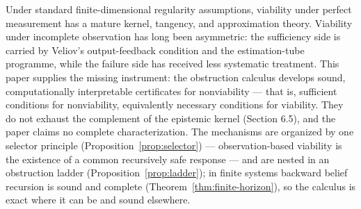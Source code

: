 \documentclass[10pt,twocolumn]{article}
\theoremstyle{definition}
\begin{document}
Under standard finite-dimensional regularity assumptions, viability under perfect measurement has a mature kernel, tangency, and approximation theory. Viability under incomplete observation has
long been asymmetric: the sufficiency side is carried by Veliov's
output-feedback condition and the estimation-tube programme, while the failure side has received less systematic treatment. This paper supplies the missing instrument: the obstruction calculus develops sound, computationally interpretable certificates for nonviability --- that is, sufficient conditions for nonviability, equivalently necessary conditions for viability. They do not exhaust the complement of the epistemic kernel (Section 6.5), and the paper claims no complete characterization. The mechanisms
are organized by one selector principle (Proposition~\ref{prop:selector}) --- observation-based viability
is the existence of a common recursively safe response --- and are
nested in an obstruction ladder (Proposition~\ref{prop:ladder}); in
finite systems backward belief recursion is sound and complete
(Theorem~\ref{thm:finite-horizon}), so the calculus is exact where it
can be and sound elsewhere.
\end{document}
